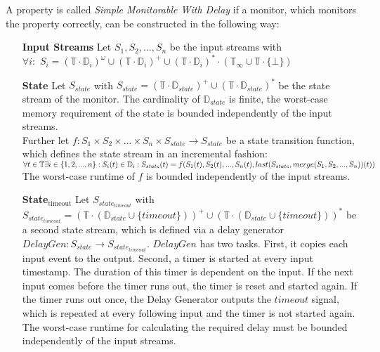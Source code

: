 	\begin{definition}
		A property is called \textit{Simple Monitorable With Delay} if a monitor, which monitors the property correctly, can be constructed in the following way:
		\begin{itemize}
			\item[\textbf{Input Streams}]
				Let $S_1, S_2, ..., S_n$ be the input streams with\\
				$\forall i:$ $S_i=(\mathbb{T}\cdot \mathbb{D}_i)^\omega\cup(\mathbb{T}\cdot \mathbb{D}_i)^+\cup(\mathbb{T}\cdot \mathbb{D}_i)^*\cdot(\mathbb{T}_\infty\cup\mathbb{T}\cdot\{\bot\})$
			\item[\textbf{State}]
				Let $S_{state}$ with $S_{state}= (\mathbb{T}\cdot \mathbb{D}_{state})^+\cup(\mathbb{T}\cdot \mathbb{D}_{state})^*$ be the state stream of the monitor. The cardinality of $\mathbb{D}_{state}$ is finite, the worst-case memory requirement of the state is bounded independently of the input streams.\\
				Further let $f: S_1 \times S_2 \times ... \times S_n \times S_{state}\rightarrow S_{state}$ be a state transition function, which defines the state stream in an incremental fashion:
				\begin{math}
					\forall t\in \mathbb T \exists i\in \{1,2,...,n\}: S_i(t)\in\mathbb D_i:\\
					S_{state}(t)= f(S_1(t), S_2(t), ..., S_n(t), last(S_{state}, merge(S_1, S_2, ..., S_n))(t))
				\end{math}\\
				The worst-case runtime of $f$ is bounded independently of the input streams.
			\item[\textbf{State$_\text{timeout}$}]
				Let $S_{state_{timeout}}$ with $S_{state_{timeout}}= (\mathbb{T}\cdot (\mathbb{D}_{state}\cup \{timeout\}))^+\cup(\mathbb{T}\cdot (\mathbb{D}_{state}\cup \{timeout\}))^*$ be a second state stream, which is defined via a delay generator $DelayGen: S_{state}\rightarrow S_{state_{timeout}}$. $DelayGen$ has two tasks. First, it copies each input event to the output. Second, a timer is started at every input timestamp. The duration of this timer is dependent on the input. If the next input comes before the timer runs out, the timer is reset and started again. If the timer runs out once, the Delay Generator outputs the $timeout$ signal, which is repeated at every following input and the timer is not started again. The worst-case runtime for calculating the required delay must be bounded independently of the input streams.

\end{itemize}
\end{definition}
